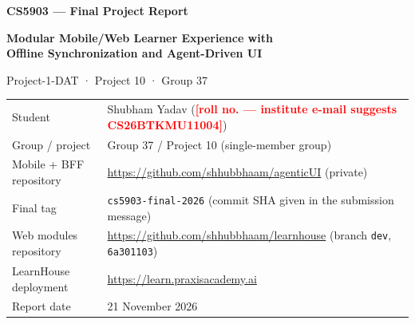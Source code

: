 \documentclass[11pt,a4paper]{article}
\newcommand{\fillin}[1]{\textcolor{red}{\textbf{[#1]}}}
\begin{document}
\sloppy
\raggedbottom

\begin{titlepage}
\centering
\vspace*{1.2cm}
{\Large\bfseries\color{accent} CS5903 — Final Project Report\par}
\vspace{0.6cm}
{\LARGE\bfseries Modular Mobile/Web Learner Experience with\\ Offline Synchronization and Agent-Driven UI\par}
\vspace{0.4cm}
{\large Project-1-DAT \;·\; Project 10 \;·\; Group 37\par}
\vspace{1.0cm}

\begin{tabularx}{0.95\textwidth}{@{}L{0.28\textwidth}Y@{}}
\toprule
Student & Shubham Yadav \quad (\fillin{roll no. — institute e-mail suggests CS26BTKMU11004}) \\
Group / project & Group 37 / Project 10 (single-member group) \\
Mobile + BFF repository & \url{https://github.com/shhubbhaam/agenticUI} (private) \\
Final tag & \texttt{cs5903-final-2026} (commit SHA given in the submission message) \\
Web modules repository & \url{https://github.com/shhubbhaam/learnhouse} (branch \texttt{dev}, \texttt{6a301103}) \\
LearnHouse deployment & \url{https://learn.praxisacademy.ai} \\
Report date & 21 November 2026 \\
\bottomrule
\end{tabularx}


\end{titlepage}
\end{document}
